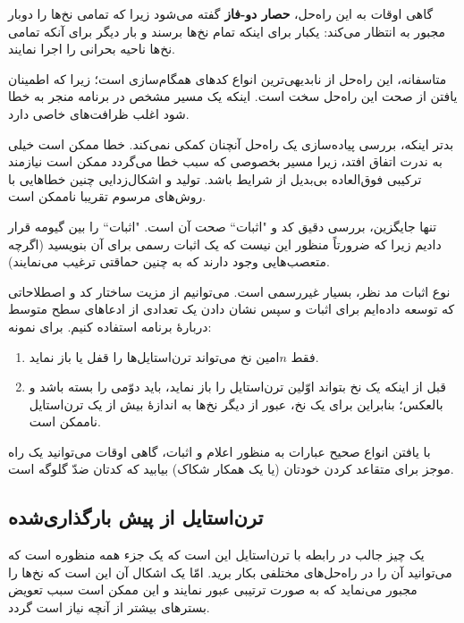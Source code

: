 \documentclass{book}
\newcommand{\clearemptydoublepage}{}%
\begin{document}
    گاهی اوقات به این راه‌حل، \textbf{حصار دو-فاز} گفته می‌شود زیرا که تمامی نخ‌ها را دوبار مجبور به انتظار می‌کند: یکبار برای اینکه تمام نخ‌ها برسند و 
    بار دیگر برای آنکه تمامی نخ‌ها ناحیه بحرانی را اجرا نمایند. 

    متاسفانه، این راه‌حل  از نابدیهی‌ترین انواع کدهای همگام‌سازی است؛ زیرا که اطمینان یافتن از صحت این راه‌حل سخت است. 
    اینکه یک مسیر مشخص در برنامه منجر به خطا شود اغلب ظرافت‌های خاصی دارد.  
    
    بدتر اینکه، بررسی پیاده‌سازی یک راه‌حل آنچنان کمکی نمی‌کند. خطا ممکن است خیلی به ندرت اتفاق افتد، 
    زیرا مسیر بخصوصی که سبب خطا می‌گردد ممکن است نیازمند ترکیبی فوق‌العاده بی‌بدیل از شرایط باشد. 
    تولید و اشکال‌زدایی چنین خطاهایی با روش‌های مرسوم تقریبا ناممکن است. 
    
    تنها جایگزین، بررسی دقیق کد و "اثبات`` صحت آن است. "اثبات`` را بین گیومه قرار دادیم زیرا که ضرورتاً منظور این نیست که یک اثبات 
    رسمی برای آن بنویسید (اگرچه متعصب‌هایی وجود دارند که به چنین حماقتی  ترغیب می‌نمایند).

نوع اثبات مد نظر، بسیار غیررسمی است. می‌توانیم از مزیت ساختار کد و اصطلاحاتی که توسعه داده‌ایم برای اثبات و سپس نشان دادن 
یک تعدادی از ادعاهای سطح متوسط دربارهٔ برنامه استفاده کنیم. برای نمونه:


    
\begin{enumerate}

\item 
    فقط $n$امین نخ می‌تواند ترن‌استایل‌ها را قفل یا باز نماید. 

\item 
    قبل از اینکه یک نخ بتواند اوّلین ترن‌استایل را باز نماید، باید دوّمی را بسته باشد و بالعکس؛‌ بنابراین برای یک نخ، عبور از دیگر نخ‌ها به اندازهٔ بیش از 
    یک تر‌ن‌استایل ناممکن است. 

\end{enumerate}

    با یافتن انواع صحیح عبارات به منظور اعلام و اثبات، گاهی اوقات می‌توانید یک راه موجز برای متقاعد کردن خودتان  (یا یک همکار 
    شکاک) بیابید که کدتان ضدّ  گلوگه است. 
    

\clearemptydoublepage
\subsection { ترن‌استایل از پیش بارگذاری‌شده}

    یک چیز جالب در رابطه با ترن‌استایل این است که یک جزء همه منظوره است که می‌توانید آن را در راه‌حل‌های مختلفی بکار برید. 
    امّا یک اشکال آن این است که نخ‌ها را مجبور می‌نماید که به صورت ترتیبی عبور نمایند و این ممکن است سبب 
    تعویض بسترهای بیشتر از آنچه نیاز است گردد.
\end{document}
